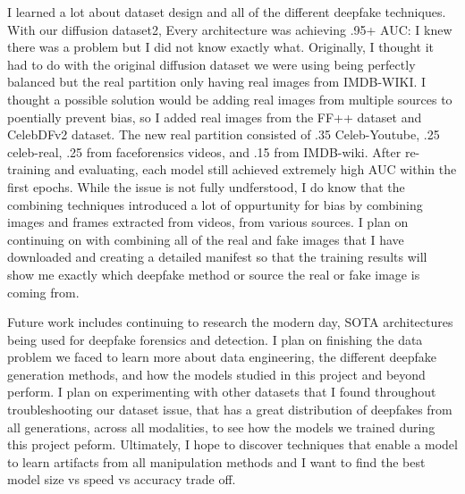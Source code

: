 \documentclass[conference]{IEEEtran}
\begin{document}
I learned a lot about  dataset design and all of the different deepfake techniques. With our diffusion dataset2, Every architecture was achieving .95+ AUC: I knew there was a problem but I did not know exactly what. Originally, I thought it had to do with the original diffusion dataset we were using being perfectly balanced but the real partition only having real images from IMDB-WIKI. I thought a possible solution would be adding real images from multiple sources to poentially prevent bias, so I added real images from the FF++ dataset and CelebDFv2 dataset. The new real partition consisted of .35 Celeb-Youtube, .25 celeb-real, .25 from faceforensics videos, and .15 from IMDB-wiki. After re-training and evaluating, each model still achieved extremely high AUC within the first epochs. While the issue is not fully undferstood, I do know that the combining techniques introduced a lot of oppurtunity for bias by combining images and frames extracted from videos, from various sources. I plan on continuing on with combining all of the real and fake images that I have downloaded and creating a detailed manifest so that the training results will show me exactly which deepfake method or source the real or fake image is coming from. 

Future work includes continuing to research the modern day, SOTA architectures being used for deepfake forensics and detection. I plan on finishing the data problem we faced to learn more about data engineering, the different deepfake generation methods, and how the models studied in this project and beyond perform. I plan on experimenting with other datasets that I found throughout troubleshooting our dataset issue, that has a great distribution of deepfakes from all generations, across all modalities, to see how the models we trained during this project peform. Ultimately, I hope to discover techniques that enable a model to learn artifacts from all manipulation methods and I want to find the best model size vs speed vs accuracy trade off.




\end{document}
